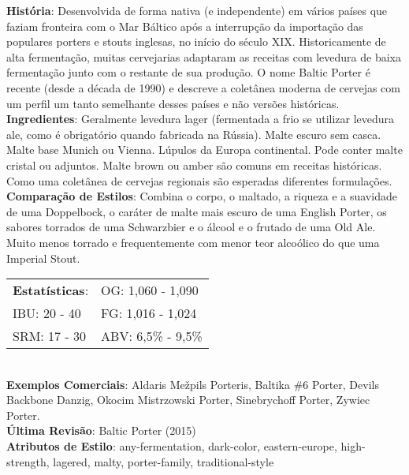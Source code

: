 \textbf{História}: Desenvolvida de forma nativa (e independente) em vários países que faziam fronteira com o Mar Báltico após a interrupção da importação das populares porters e stouts inglesas, no início do século XIX. Historicamente de alta fermentação, muitas cervejarias adaptaram as receitas com levedura de baixa fermentação junto com o restante de sua produção. O nome Baltic Porter é recente (desde a década de 1990) e descreve a coletânea moderna de cervejas com um perfil um tanto semelhante desses países e não versões históricas. \\
\textbf{Ingredientes}: Geralmente levedura lager (fermentada a frio se utilizar levedura ale, como é obrigatório quando fabricada na Rússia). Malte escuro sem casca. Malte base Munich ou Vienna. Lúpulos da Europa continental. Pode conter malte cristal ou adjuntos. Malte brown ou amber são comuns em receitas históricas. Como uma coletânea de cervejas regionais são esperadas diferentes formulações. \\
\textbf{Comparação de Estilos}: Combina o corpo, o maltado, a riqueza e a suavidade de uma Doppelbock, o caráter de malte mais escuro de uma English Porter, os sabores torrados de uma Schwarzbier e o álcool e o frutado de uma Old Ale. Muito menos torrado e frequentemente com menor teor alcoólico do que uma Imperial Stout. \\
\begin{tabular}{@{}p{35mm}p{35mm}@{}}
  \textbf{Estatísticas}: & OG: 1,060 - 1,090 \\
  IBU: 20 - 40 & FG: 1,016 - 1,024 \\
  SRM: 17 - 30 & ABV: 6,5\% - 9,5\%
\end{tabular}\\
\textbf{Exemplos Comerciais}: Aldaris Mežpils Porteris, Baltika \#6 Porter, Devils Backbone Danzig, Okocim Mistrzowski Porter, Sinebrychoff Porter, Zywiec Porter. \\
\textbf{Última Revisão}: Baltic Porter (2015) \\
\textbf{Atributos de Estilo}: any-fermentation, dark-color, eastern-europe, high-strength, lagered, malty, porter-family, traditional-style
